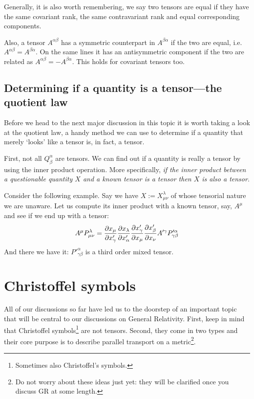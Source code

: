 \documentclass{tufte-handout}
\begin{document}
Generally, it is also worth remembering, we say two tensors are equal if they have the same covariant rank, the same contravariant rank and equal corresponding components.

Also, a tensor $A^{\alpha\beta}$ has a symmetric counterpart in $A^{\beta\alpha}$ if the two are equal, i.e. $A^{\alpha\beta} = A^{\beta\alpha}$. On the same lines it has an antisymmetric component if the two are related as $A^{\alpha\beta} = -A^{\beta\alpha}$. This holds for covariant tensors too.

\subsection{Determining if a quantity is a tensor---the quotient law}

Before we head to the next major discussion in this topic it is worth taking a look at the quotient law, a handy method we can use to determine if a quantity that merely `looks' like a tensor is, in fact, a tensor.

First, not all $Q^\alpha_\beta$ are tensors. We can find out if a quantity is really a tensor by using the inner product operation. More specifically, \textit{if the inner product between a questionable quantity $X$ and a known tensor is a tensor then $X$ is also a tensor}.

Consider the following example. Say we have $X := X^\lambda_{\mu\nu}$ of whose tensorial nature we are unaware. Let us compute its inner product with a known tensor, say, $A^\mu$ and see if we end up with a tensor:
\[
	A^\mu P^\lambda_{\mu\nu} = {\partial x_\mu \over \partial x'_\gamma} {\partial x_\lambda \over \partial x'_\alpha} {\partial x'_\gamma \over \partial x_\mu} {\partial x'_\beta \over \partial x_\nu} A'^\gamma P'^\alpha_{\gamma\beta}
\]
And there we have it: $P'^\alpha_{\gamma\beta}$ is a third order mixed tensor.

\section{Christoffel symbols}

All of our discussions so far have led us to the doorstep of an important topic that will be central to our discussions on General Relativity. First, keep in mind that Christoffel symbols\footnote{Sometimes also Christoffel's symbols.} are not tensors. Second, they come in two types and their core purpose is to describe parallel transport on a metric\footnote{Do not worry about these ideas just yet: they will be clarified once you discuss GR at some length.}.
\end{document}
